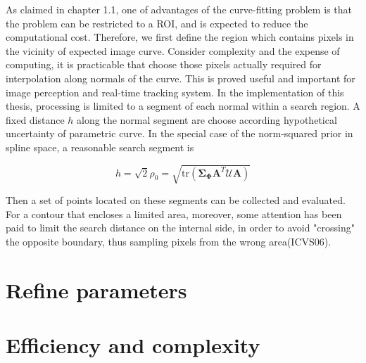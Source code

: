 As claimed in chapter 1.1, one of advantages of the curve-fitting
problem is that the problem can be restricted to a ROI, and is
expected to reduce the computational cost. Therefore, we first define
the region which contains pixels in the vicinity of expected image
curve. 
Consider complexity and the expense of computing, it is practicable
that choose those pixels actually required for interpolation along
normals of the curve. This is proved useful and important for image
perception and real-time tracking system. In the implementation of
this thesis, processing is limited to a segment of each normal within
a search region. A fixed distance $h$ along the normal segment are
choose according hypothetical uncertainty of parametric curve. In the
special case of the norm-squared prior in spline space, a reasonable
search segment is 

\begin{equation}
  \label{eq:5.4}
  h = \sqrt{2} \rho_0 = \sqrt{\mathrm{tr}(\mathbf{\Sigma}_{\mathbf{\Phi}}\mathbf{A}^T\mathcal{U}\mathbf{A})}
\end{equation}

Then a set of points located on these segments can be collected and
evaluated. For a contour that encloses a limited area, moreover, some attention has been
paid to limit the search distance on the internal side, in order
to avoid "crossing" the opposite boundary, thus sampling
pixels from the wrong area(ICVS06).

\section{Refine parameters}
\label{sec:ref}

\section{Efficiency and complexity}
\label{sec:eff}



